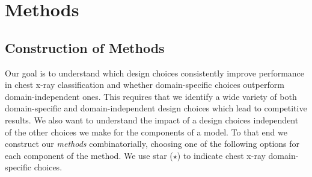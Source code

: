 \section{Methods}
\label{sec:methods}
\subsection{Construction of Methods}
Our goal is to understand which design choices consistently improve performance in chest x-ray classification and whether domain-specific choices outperform domain-independent ones. This requires that we identify a wide variety of both domain-specific and domain-independent design choices which lead to competitive results. We also want to understand the impact of a design choices independent of the other choices we make for the components of a model. To that end we construct our \emph{methods} combinatorially, choosing one of the following options for each component of the method. We use star ($\star$) to indicate chest x-ray domain-specific choices.
